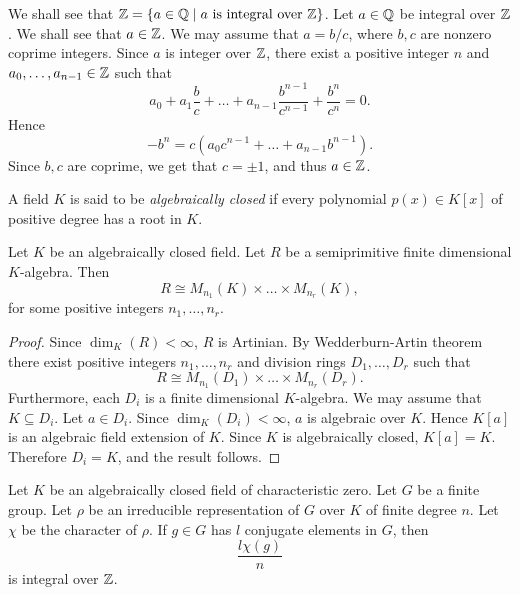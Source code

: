 \begin{example}\label{Zintclosed}
We shall see that $\mathbb{Z}=\{ a\in \mathbb{Q}\mid a \mbox{ is integral over }\mathbb{Z}\}$. Let $a\in \mathbb{Q}$ be integral over $\mathbb{Z}$. We shall see that $a\in\mathbb{Z}$.
We may assume that $a=b/c$, where $b,c$ are nonzero coprime integers. Since $a$ is integer over $\mathbb{Z}$, there exist a positive integer $n$ and $a_0,\dots ,a_{n-1}\in \mathbb{Z}$ such that
\[ a_0+a_1\frac{b}{c}+\dots +a_{n-1}\frac{b^{n-1}}{c^{n-1}}+\frac{b^{n}}{c^{n}}=0.\]
Hence
\[-b^n=c(a_0c^{n-1}+\dots +a_{n-1}b^{n-1}).\]
Since $b,c$ are coprime, we get that $c=\pm 1$, and thus $a\in \mathbb{Z}$.
\end{example}

A field $K$ is said to be {\em algebraically closed} if every polynomial $p(x)\in K[x]$ of positive degree has a root in $K$.

\begin{proposition}\label{algclosedfield}
Let $K$ be an algebraically closed field. Let $R$ be a semiprimitive finite dimensional $K$-algebra.
Then
\[ R\cong M_{n_1}(K)\times\dots\times M_{n_r}(K),\]
for some positive integers $n_1,\dots ,n_r$.
\end{proposition}

\begin{proof}
    Since $\dim_K(R)<\infty$, $R$ is Artinian. By Wedderburn-Artin theorem there exist positive integers $n_1,\dots ,n_r$
    and division rings $D_1,\dots ,D_r$ such that
    \[ R\cong M_{n_1}(D_1)\times\dots\times M_{n_r}(D_r).\]
    Furthermore, each $D_i$ is a finite dimensional $K$-algebra. We may assume that $K\subseteq D_i$. Let $a\in D_i$. Since
    $\dim_K(D_i)<\infty$, $a$ is algebraic over $K$. Hence $K[a]$ is an algebraic field extension of $K$. Since $K$ is algebraically closed, $K[a]=K$. Therefore $D_i=K$, and the result follows.
\end{proof}

\begin{proposition}\label{integraloverZ}
Let $K$ be an algebraically closed field of characteristic zero. Let $G$ be a finite group. Let $\rho$ be an 
irreducible representation of $G$ over $K$ of finite degree $n$. Let $\chi$ be the character of $\rho$. If $g\in G$ has $l$ conjugate elements
in $G$, then 
\[\frac{l\chi(g)}{n}\]
is integral over $\mathbb{Z}$.
\end{proposition}

